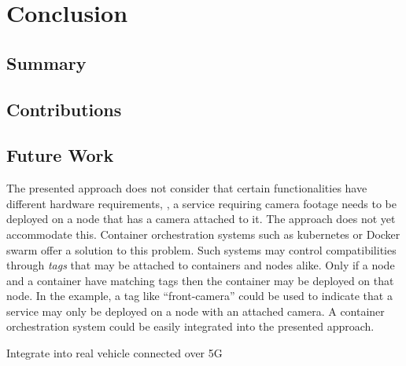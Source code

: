 
\chapter{Conclusion}\label{chapter:conclusion}

\section{Summary}


\section{Contributions}


\section{Future Work}

The presented approach does not consider that certain functionalities have different hardware requirements, \ie , a service requiring camera footage needs to be deployed on a node that has a camera attached to it. The approach does not yet accommodate this. Container orchestration systems such as kubernetes or Docker swarm offer a solution to this problem. Such systems may control compatibilities through \emph{tags} that may be attached to containers and nodes alike. Only if a node and a container have matching tags then the container may be deployed on that node. In the example, a tag like ``front-camera'' could be used to indicate that a service may only be deployed on a node with an attached camera. A container orchestration system could be easily integrated into the presented approach. 

Integrate into real vehicle connected over 5G